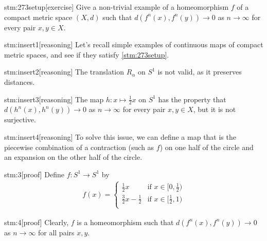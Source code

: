 \documentclass{article}
\begin{document}

\begin{stm}{stm:273setup}[exercise]
Give a non-trivial example of a homeomorphism $f$ of a compact metric space $(X,d)$ such that $d(f^n(x), f^n(y)) \to 0$ as $n \to \infty$ for every pair $x,y \in X$.
\end{stm}


\begin{stm}{stm:insert1}[reasoning]
Let's recall simple examples of continuous maps of compact metric spaces, and see if they satisfy \ref{stm:273setup}.
\end{stm}

\begin{stm}{stm:insert2}[reasoning]
The translation $R_\alpha$ on $S^1$ is not valid, as it preserves distances.
\end{stm}

\begin{stm}{stm:insert3}[reasoning]
The map $h: x \mapsto \frac{1}{2}x$ on $S^1$ has the property that $d(h^n(x), h^n(y)) \to 0$ as $n \to \infty$ for every pair $x,y \in X$, but it is not surjective.
\end{stm}

\begin{stm}{stm:insert4}[reasoning]
To solve this issue, we can define a map that is the piecewise combination of a contraction (such as $f$) on one half of the circle and an expansion on the other half of the circle.
\end{stm}

\begin{stm}{stm:3}[proof]
Define $f: S^1 \to S^1$ by
\begin{align*}
f(x) = 
\begin{cases}
\frac{1}{2}x & \text{if } x \in [0, \frac{1}{2}) \\
\frac{3}{2}x - \frac{1}{2} & \text{if } x \in [\frac{1}{2}, 1) \\
\end{cases}
\end{align*}
\end{stm}

\begin{stm}{stm:4}[proof]
Clearly, $f$ is a homeomorphism such that $d(f^n(x), f^n(y)) \to 0$ as $n \to \infty$ for all pairs $x, y$.
\end{stm}
\end{document}
